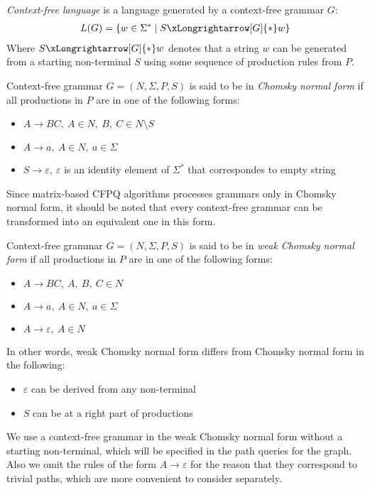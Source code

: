 \begin{definition} \emph{Context-free language} is a language generated by a context-free grammar $G$:
\begin{align*}
     L(G) = \{w \in \Sigma^* \mid S \xLongrightarrow[G]{*} w \} 
\end{align*}
Where $S \xLongrightarrow[G]{*} w$  denotes that a string $w$ can be generated from a starting non-terminal $S$ using some sequence of production rules from $P$.
\end{definition}
\begin{definition} Context-free grammar $G = (N, \Sigma, P, S)$ is said to be in \emph{Chomsky normal form} if all productions in $P$ are in one of the following forms:
    \begin{itemize}
        \item $A \rightarrow BC,~A \in N,~B,~C \in N \setminus S$
        \item  $A \rightarrow a,~A \in N,~a \in \Sigma$
        \item $S \rightarrow \varepsilon,~\varepsilon$ is an identity element of $\Sigma^*$ that correspondes to empty string
    \end{itemize}
\end{definition}
 Since matrix-based CFPQ algorithms processes grammars only in Chomsky normal form, it should be noted that every context-free grammar can be transformed into an equivalent one in this form. 
\begin{definition} Context-free grammar $G = (N, \Sigma, P, S)$ is said to be in \emph{weak Chomsky normal form} if all productions in $P$ are in one of the following forms:
    \begin{itemize}
        \item $A \rightarrow BC,~A,~B,~C \in N$
        \item  $A \rightarrow a,~A \in N,~a \in \Sigma$
        \item $A \rightarrow \varepsilon,~A \in N$
    \end{itemize}
\end{definition}
In other words, weak Chomsky normal form differs from Chomsky normal form in the following:
\begin{itemize}
    \item $\varepsilon$ can be derived from any non-terminal
    \item $S$ can be at a right part of productions
\end{itemize}

We use a context-free grammar in the weak Chomsky normal form without a starting non-terminal, which will be specified in the path queries for the graph. Also we omit the rules of the form $A \rightarrow \varepsilon$ for the reason that they correspond to trivial paths, which are more convenient to consider separately.

